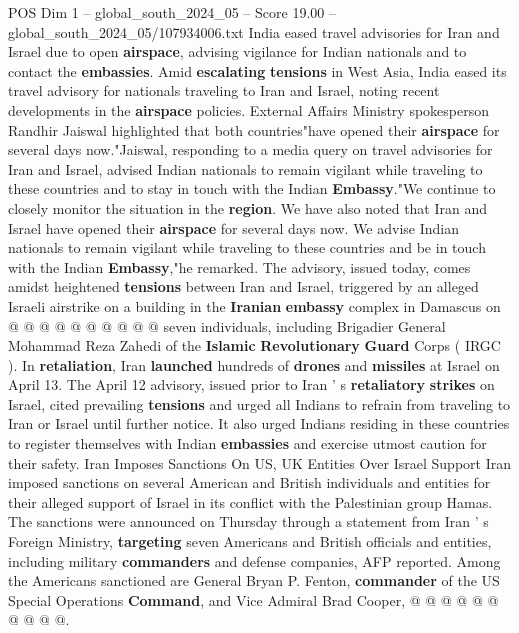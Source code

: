 \begin{textsample}{POS Dim 1 – global\_south\_2024\_05 – Score 19.00 – global\_south\_2024\_05/107934006.txt}  \label{ex:f1_pos_243}
India eased travel advisories for Iran and Israel due to open \textbf{airspace}, advising vigilance for Indian nationals and to contact the \textbf{embassies}.
Amid \textbf{escalating} \textbf{tensions} in West Asia, India eased its travel advisory for nationals traveling to Iran and Israel, noting recent developments in the \textbf{airspace} policies.
External Affairs Ministry spokesperson Randhir Jaiswal highlighted that both countries"have opened their \textbf{airspace} for several days now."Jaiswal, responding to a media query on travel advisories for Iran and Israel, advised Indian nationals to remain vigilant while traveling to these countries and to stay in touch with the Indian \textbf{Embassy}."We continue to closely monitor the situation in the \textbf{region}.
We have also noted that Iran and Israel have opened their \textbf{airspace} for several days now.
We advise Indian nationals to remain vigilant while traveling to these countries and be in touch with the Indian \textbf{Embassy},"he remarked.
The advisory, issued today, comes amidst heightened \textbf{tensions} between Iran and Israel, triggered by an alleged Israeli airstrike on a building in the \textbf{Iranian} \textbf{embassy} complex in Damascus on @ @ @ @ @ @ @ @ @ @ seven individuals, including Brigadier General Mohammad Reza Zahedi of the \textbf{Islamic} \textbf{Revolutionary} \textbf{Guard} Corps ( IRGC ).
In \textbf{retaliation}, Iran \textbf{launched} hundreds of \textbf{drones} and \textbf{missiles} at Israel on April 13.
The April 12 advisory, issued prior to Iran ' s \textbf{retaliatory} \textbf{strikes} on Israel, cited prevailing \textbf{tensions} and urged all Indians to refrain from traveling to Iran or Israel until further notice.
It also urged Indians residing in these countries to register themselves with Indian \textbf{embassies} and exercise utmost caution for their safety.
Iran Imposes Sanctions On US, UK Entities Over Israel Support Iran imposed sanctions on several American and British individuals and entities for their alleged support of Israel in its conflict with the Palestinian group Hamas.
The sanctions were announced on Thursday through a statement from Iran ' s Foreign Ministry, \textbf{targeting} seven Americans and British officials and entities, including military \textbf{commanders} and defense companies, AFP reported.
Among the Americans sanctioned are General Bryan P.
Fenton, \textbf{commander} of the US Special Operations \textbf{Command}, and Vice Admiral Brad Cooper, @ @ @ @ @ @ @ @ @ @.

\end{textsample}

